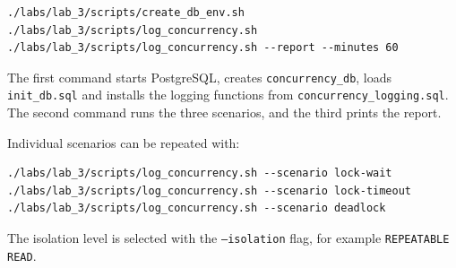 \documentclass[11pt]{article}
\begin{document}
\begin{verbatim}
./labs/lab_3/scripts/create_db_env.sh
./labs/lab_3/scripts/log_concurrency.sh
./labs/lab_3/scripts/log_concurrency.sh --report --minutes 60
\end{verbatim}

The first command starts PostgreSQL, creates \texttt{concurrency\_db}, loads
\texttt{init\_db.sql} and installs the logging functions from
\texttt{concurrency\_logging.sql}. The second command runs the three scenarios,
and the third prints the report.

Individual scenarios can be repeated with:

\begin{verbatim}
./labs/lab_3/scripts/log_concurrency.sh --scenario lock-wait
./labs/lab_3/scripts/log_concurrency.sh --scenario lock-timeout
./labs/lab_3/scripts/log_concurrency.sh --scenario deadlock
\end{verbatim}

The isolation level is selected with the
\texttt{--isolation} flag, for example
\texttt{REPEATABLE READ}.
\end{document}
